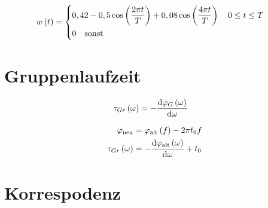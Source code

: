\begin{boxleft}
\end{boxleft}\begin{boxrightshaded}
\begin{align*}
w\left(t\right)&=
\begin{dcases*}
  0,42-0,5\cos\left(\frac{2\pi t}{T}\right)+0,08\cos\left(\frac{4\pi t}{T}\right)\quad 0\leq t\leq T\\
  0\quad\text{sonst} 
\end{dcases*}
\end{align*}
\end{boxrightshaded}

\section{Gruppenlaufzeit}

\begin{boxleft}
\end{boxleft}\begin{boxrightshaded}
\begin{align*}
\tau_{Gr}\left(\omega\right)&=-\frac{\mathop{}\!\mathrm{d}\varphi_G\left(\omega\right)}{\mathop{}\!\mathrm{d} \omega}
\end{align*}
\end{boxrightshaded}

\begin{boxleft}
\end{boxleft}\begin{boxrightshaded}
\begin{align*}
\varphi_{\text{neu}}&=\varphi_{\text{alt}}\left(f\right)-2\pi t_0 f\\
\tau_{Gr}\left(\omega\right)&=-\frac{\mathop{}\!\mathrm{d}\varphi_{\text{alt}}\left(\omega\right)}{\mathop{}\!\mathrm{d} \omega}+t_0
\end{align*}
\end{boxrightshaded}

\section{Korrespodenz}

